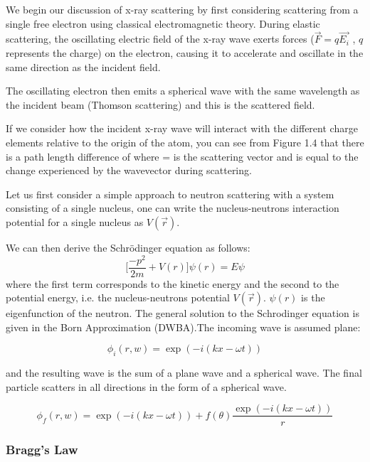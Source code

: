 We begin our discussion of x-ray scattering by first considering scattering from a single free electron using classical electromagnetic theory. During elastic scattering, the oscillating electric field of the x-ray wave exerts forces ($\vec{F} = q \vec{E_i}$ , $q$ represents the charge) on the electron, causing it to accelerate and oscillate in the same direction as the incident field.

The oscillating electron then emits a spherical wave with the same wavelength as the incident beam (Thomson scattering) and this is the scattered field.

If we consider how the incident x-ray wave will interact with the different charge elements relative to the origin of the atom, you can see from Figure 1.4 that there is a path length difference of   where  =  is the scattering vector and is equal to the change experienced by the wavevector during scattering.

Let us first consider a simple approach to neutron scattering with a system consisting of a single nucleus, one can write the nucleus-neutrons interaction potential for a single nucleus as $V(\vec{r})$.

We can then derive the Schrödinger equation as follows:
\begin{equation}
\label{eq:Schrodinger}
    \bigg[ \frac{-p^2}{2m} +V(r) \bigg] \psi(r)= E\psi
\end{equation}{}
where the first term corresponds to the kinetic energy and the second to the potential energy, i.e. the nucleus-neutrons potential $V(\vec{r})$. $\psi(r)$ is the eigenfunction of the neutron.
The general solution to the Schrodinger equation is given in the Born Approximation (DWBA).The incoming wave is assumed plane:

\begin{equation}
\label{eq:incwave}
    \phi_i(r,w)=\exp{(-i(kx-\omega t))}
\end{equation}{}

and the resulting wave is the sum of a plane wave and a spherical wave. The final particle scatters in all directions in the form of a spherical wave.

\begin{equation}
    \label{eq:resultwave}
    \phi_f(r,w)=\exp{(-i(kx-\omega t))} + f(\theta)\frac{\exp{(-i(kx-\omega t))}}{r}
\end{equation}{}

\subsubsection{Bragg's Law}

